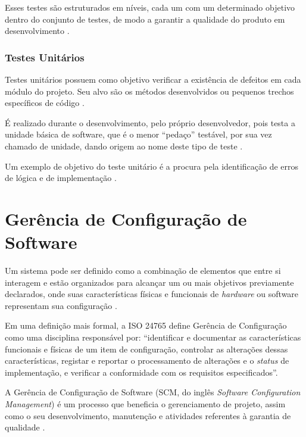 Esses testes são estruturados em níveis, cada um com um determinado objetivo dentro do conjunto de testes, de modo a garantir a qualidade do produto em desenvolvimento \cite{sw_test_tech}.

    \subsubsection{Testes Unitários}
    Testes unitários possuem como objetivo verificar a existência de defeitos em cada módulo do projeto. Seu alvo são os métodos desenvolvidos ou pequenos trechos específicos de código \cite{artigo_intro_teste}.

    É realizado durante o desenvolvimento, pelo próprio desenvolvedor, pois testa a unidade básica de software, que é o menor ``pedaço''  testável, por sua vez chamado de unidade, dando origem ao nome deste tipo de teste \cite{sw_test_tech}.

    Um exemplo de objetivo do teste unitário é a procura pela identificação de erros de lógica e de implementação \cite{maldonado}.

\section{Gerência de Configuração de Software}
Um sistema pode ser definido como a combinação de elementos que entre si interagem e estão organizados para alcançar um ou mais objetivos previamente declarados, onde suas características físicas e funcionais de \textit{hardware} ou software representam sua configuração \cite{SWEBOK2014}.

Em uma definição mais formal, a ISO 24765 \cite{iso_24765} define Gerência de Configuração como uma disciplina responsável por: ``identificar e documentar as características funcionais e físicas de um item de configuração, controlar as alterações dessas características, registar e reportar o processamento de alterações e o \textit{status} de implementação, e verificar a conformidade com os requisitos especificados''.

A Gerência de Configuração de Software (SCM, do inglês \textit{Software Configuration Management}) é um processo que beneficia o gerenciamento de projeto, assim como o seu desenvolvimento, manutenção e atividades referentes à garantia de qualidade \cite{SWEBOK2014}.

